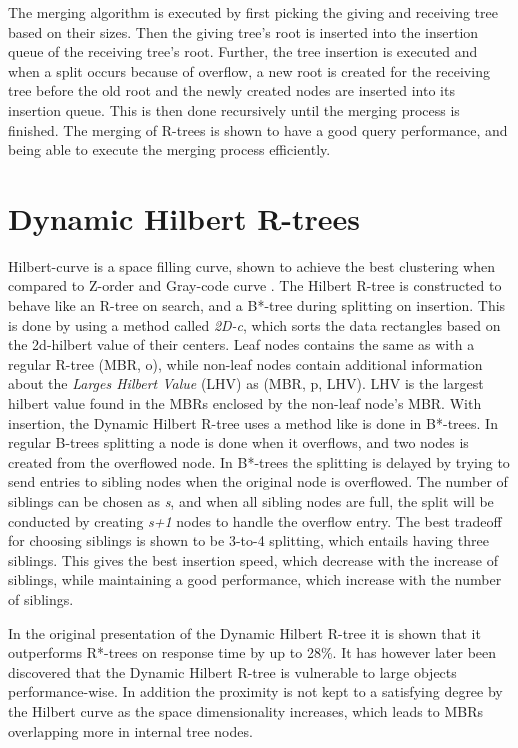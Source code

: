 \noindent
The merging algorithm is executed by first picking the giving and receiving tree based on their sizes. Then the giving tree's root is inserted into the insertion queue of the receiving tree's root. Further, the tree insertion is executed and when a split occurs because of overflow, a new root is created for the receiving tree before the old root and the newly created nodes are inserted into its insertion queue. This is then done recursively until the merging process is finished. The merging of R-trees is shown to have a good query performance, and being able to execute the merging process efficiently\cite{MergingRtree}.

\section{Dynamic Hilbert R-trees}
Hilbert-curve is a space filling curve, shown to achieve the best clustering when compared to Z-order and Gray-code curve \cite{AnalysisHilbert}. The Hilbert R-tree is constructed to behave like an R-tree on search, and a B*-tree during splitting on insertion. This is done by using a method called \emph{2D-c}, which sorts the data rectangles based on the 2d-hilbert value of their centers. Leaf nodes contains the same as with a regular R-tree (MBR, o), while non-leaf nodes contain additional information about the \emph{Larges Hilbert Value} (LHV) as (MBR, p, LHV). LHV is the largest hilbert value found in the MBRs enclosed by the non-leaf node's MBR. With insertion, the Dynamic Hilbert R-tree uses a method like is done in B*-trees. In regular B-trees splitting a node is done when it overflows, and two nodes is created from the overflowed node. In B*-trees the splitting is delayed by trying to send entries to sibling nodes when the original node is overflowed. The number of siblings can be chosen as \emph{s}, and when all sibling nodes are full, the split will be conducted by creating \emph{s+1} nodes to handle the overflow entry. The best tradeoff for choosing siblings is shown to be 3-to-4 splitting, which entails having three siblings. This gives the best insertion speed, which decrease with the increase of siblings, while maintaining a good performance, which increase with the number of siblings.\newline

\noindent
In the original presentation of the Dynamic Hilbert R-tree it is shown that it outperforms R*-trees on response time by up to 28\%\cite{HilbertRTree}. It has however later been discovered that the Dynamic Hilbert R-tree is vulnerable to large objects performance-wise. In addition the proximity is not kept to a satisfying degree by the Hilbert curve as the space dimensionality increases, which leads to MBRs overlapping more in internal tree nodes\cite{RTreesTheoryApplications}.

